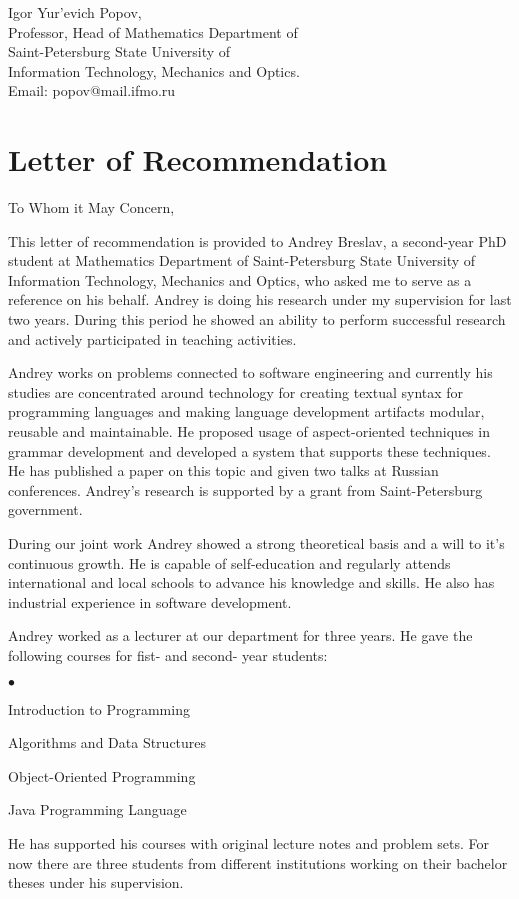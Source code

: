 \documentclass{book}
\begin{document}
\begin{flushright}
\noindent Igor Yur'evich Popov,\\
Professor, Head of Mathematics Department of \\
Saint-Petersburg State University of \\
Information Technology, Mechanics and Optics.\\

Email: popov@mail.ifmo.ru
\end{flushright}
\vspace{20pt}
\section*{\protect \centering Letter of Recommendation}
\vspace{10pt}
To Whom it May Concern,

\vspace{10pt}
\noindent This letter of recommendation is provided to Andrey Breslav, a second-year PhD student at Mathematics Department of Saint-Petersburg State University of Information Technology, Mechanics and Optics, who asked me to serve as a reference on his behalf. Andrey is doing his research under my supervision for last two years. During this period he showed an ability to perform successful research and actively participated in teaching activities. 

Andrey works on problems connected to software engineering and currently his studies are concentrated around technology for creating textual syntax for programming languages and making language development artifacts modular, reusable and maintainable. He proposed usage of aspect-oriented techniques in grammar development and developed a system that supports these techniques. He has published a paper on this topic and given two talks at Russian conferences. Andrey's research is supported by a grant from Saint-Petersburg government.

During our joint work Andrey showed a strong theoretical basis and a will to it's continuous growth. He is capable of self-education and regularly attends international and local schools to advance his knowledge and skills. He also has industrial experience in software development.

Andrey worked as a lecturer at our department for three years. He gave the following courses for fist- and second- year students:
\begin{list}{$\bullet$}{\topsep 0pt \itemsep -3pt}
	\item Introduction to Programming 
	\item Algorithms and Data Structures
	\item Object-Oriented Programming
	\item Java Programming Language
\end{list}
He has supported his courses with original lecture notes and problem sets.
For now there are three students from different institutions working on their bachelor theses under his supervision.
\end{document}
